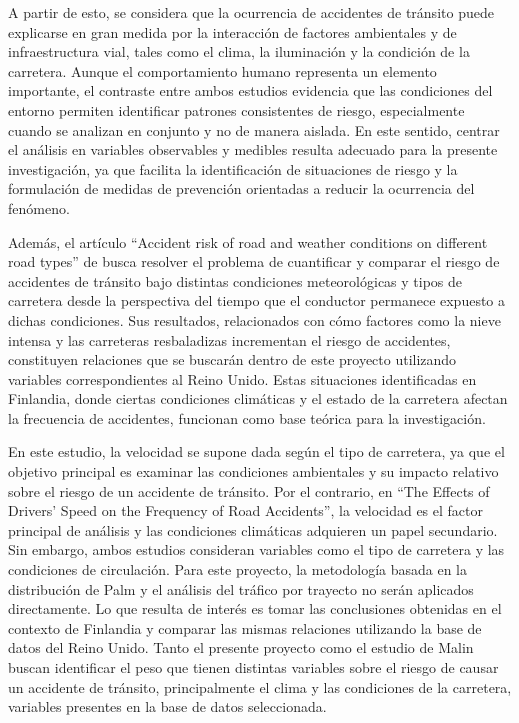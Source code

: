 \documentclass[12pt]{article}
\begin{document}
A partir de esto, se considera que la ocurrencia de accidentes de tránsito puede explicarse en gran medida por la interacción de factores ambientales y de infraestructura vial, tales como el clima, la iluminación y la condición de la carretera. Aunque el comportamiento humano representa un elemento importante, el contraste entre ambos estudios evidencia que las condiciones del entorno permiten identificar patrones consistentes de riesgo, especialmente cuando se analizan en conjunto y no de manera aislada. En este sentido, centrar el análisis en variables observables y medibles resulta adecuado para la presente investigación, ya que facilita la identificación de situaciones de riesgo y la formulación de medidas de prevención orientadas a reducir la ocurrencia del fenómeno.


Además, el artículo “Accident risk of road and weather conditions on different road types” de \textcite{MALIN2019} busca resolver el problema de cuantificar y comparar el riesgo de accidentes de tránsito bajo distintas condiciones meteorológicas y tipos de carretera desde la perspectiva del tiempo que el conductor permanece expuesto a dichas condiciones. Sus resultados, relacionados con cómo factores como la nieve intensa y las carreteras resbaladizas incrementan el riesgo de accidentes, constituyen relaciones que se buscarán dentro de este proyecto utilizando variables correspondientes al Reino Unido. Estas situaciones identificadas en Finlandia, donde ciertas condiciones climáticas y el estado de la carretera afectan la frecuencia de accidentes, funcionan como base teórica para la investigación.


En este estudio, la velocidad se supone dada según el tipo de carretera, ya que el objetivo principal es examinar las condiciones ambientales y su impacto relativo sobre el riesgo de un accidente de tránsito. Por el contrario, en “The Effects of Drivers’ Speed on the Frequency of Road Accidents”, la velocidad es el factor principal de análisis y las condiciones climáticas adquieren un papel secundario. Sin embargo, ambos estudios consideran variables como el tipo de carretera y las condiciones de circulación. Para este proyecto, la metodología basada en la distribución de Palm y el análisis del tráfico por trayecto no serán aplicados directamente. Lo que resulta de interés es tomar las conclusiones obtenidas en el contexto de Finlandia y comparar las mismas relaciones utilizando la base de datos del Reino Unido. Tanto el presente proyecto como el estudio de Malin buscan identificar el peso que tienen distintas variables sobre el riesgo de causar un accidente de tránsito, principalmente el clima y las condiciones de la carretera, variables presentes en la base de datos seleccionada.
\end{document}
